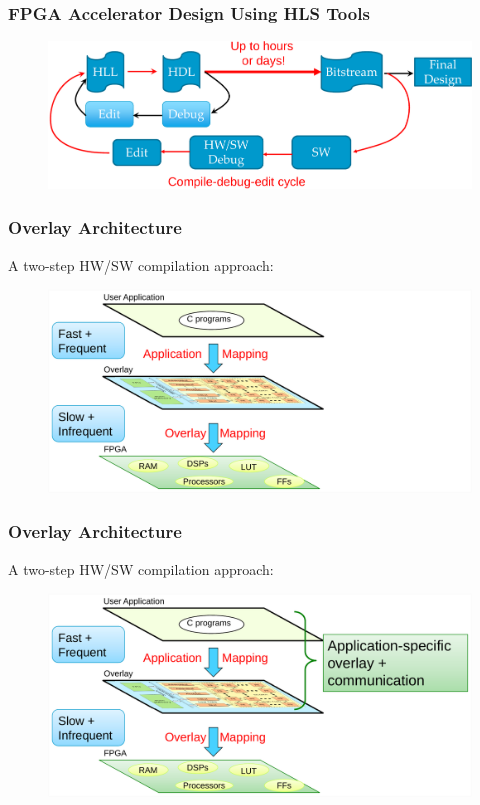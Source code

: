 \documentclass[accentcolor=tud1a,colorbacktitle,inverttitle,landscape,german,presentation,t]{tudbeamer}
\begin{document}
   \begin{frame}
   \frametitle{FPGA Accelerator Design Using HLS Tools}
   \begin{figure}
      \includegraphics[width=.9\linewidth]{fpga-challenge-detail}
   \end{figure}

{}
   \end{frame}

   \begin{frame}
   \frametitle{Overlay Architecture}
   A two-step HW/SW compilation approach:
   \begin{figure}
      \includegraphics[width=.9\linewidth]{overlay-architecture1}
   \end{figure}
   \end{frame}

   \begin{frame}
   \frametitle{Overlay Architecture}
   A two-step HW/SW compilation approach:
   \begin{figure}
      \includegraphics[width=.9\linewidth]{overlay-architecture2}
   \end{figure}
   \end{frame}
   
\end{document}
